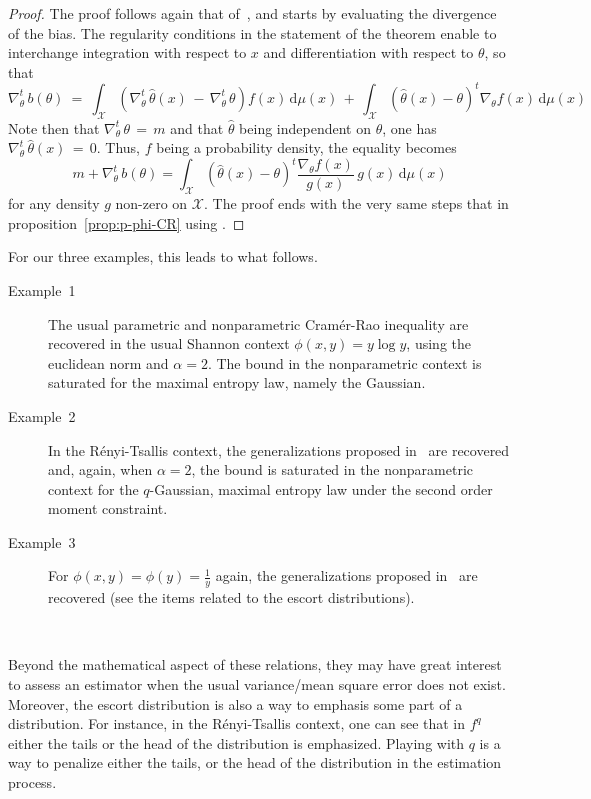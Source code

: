 \documentclass[entropy,article,submit,moreauthors,pdftex]{Definitions/mdpi}
\newcommand{\SZ}[1]{{\color{blue} #1}}
\def\dmu{\mathrm{d}\mu}
\def\X{\mathcal{X}}
\begin{document}
\begin{proof}
  The proof  follows again  that of~\cite{Ber13}, and  starts by  evaluating the
  divergence of  the bias.  The  regularity conditions  in the statement  of the
  theorem  enable   to  interchange   integration  with   respect  to   $x$  and
  differentiation with respect to $\theta$, so that
  \[
  \nabla_\theta^t  \,  b(\theta)  \:  = \:  \int_\X  \left(  \nabla_\theta^t  \,
  \widehat{\theta}(x) \, - \, \nabla_\theta^t  \, \theta \right) f(x) \, \dmu(x)
  \, +  \, \int_\X \left(  \widehat{\theta}(x) - \theta  \right)^t \nabla_\theta
  f(x) \, \dmu(x)
  \]
  Note   then  that   $\nabla_\theta^t  \,   \theta  \,   =  \,   m$  and   that
  $\widehat{\theta}$ being independent on  $\theta$, one has $\nabla_\theta^t \,
  \widehat{\theta}(x) \,  = \, 0$.  Thus, $f$  being a probability  density, the
  equality becomes
  \[
  m + \nabla_\theta^t \, b(\theta) = \int_\X \left( \widehat{\theta}(x) - \theta
  \right)^t \frac{\nabla_\theta f(x)}{g(x)} \, g(x) \, \dmu(x)
  \]
  for any density $g$ non-zero on $\X$.  The proof ends with the very same steps
  that in proposition~\ref{prop:p-phi-CR} using \cite[Lemma~2]{Ber13}.
\end{proof}

%
For our three examples, this leads to what follows.
%
\begin{description}
\item[Example~1] The usual parametric  and nonparametric Cram\'er-Rao inequality
  are recovered in the  usual Shannon context $\phi(x,y) = y  \log y$, using the
  euclidean norm  and $\alpha =  2$. The bound  in the nonparametric  context is
  saturated for the maximal entropy law, namely the Gaussian.
%
\item[Example~2] In  the R\'enyi-Tsallis  context, the  generalizations proposed
  in~\cite{Ber12:06_1, Ber12:06_2, Ber13} are recovered and, again, when $\alpha
  =  2$,  the   bound  is  saturated  in  the  nonparametric   context  for  the
  $q$-Gaussian, maximal entropy law under the second order moment constraint.
%
\item[Example~3]  For  $\phi(x,y)  =   \phi(y)  =  \frac{1}{y}$  \SZ{again,  the
  generalizations   proposed   in~\cite{Ber12:06_1,   Ber12:06_2,   Ber13}   are
  recovered} (see the items related to the escort distributions).
\end{description}

\

Beyond the mathematical aspect of these  relations, they may have great interest
to  assess an  estimator  when the  usual variance/mean  square  error does  not
exist. Moreover, the escort distribution is also  a way to emphasis some part of
a distribution. For  instance, in the R\'enyi-Tsallis context, one  can see that
in $f^q$ either the tails or the head of the distribution is emphasized. Playing
with $q$ is a way to penalize either  the tails, or the head of the distribution
in the estimation process.
\end{document}
